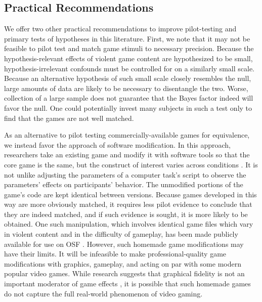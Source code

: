 \documentclass[man]{apa6}
\begin{document}
\subsection{Practical Recommendations}
We offer two other practical recommendations to improve pilot-testing and primary tests of hypotheses in this literature. First, we note that it may not be feasible to pilot test and match game stimuli to necessary precision. Because the hypothesis-relevant effects of violent game content are hypothesized to be small, hypothesis-irrelevant confounds must be controlled for on a similarly small scale. Because an alternative hypothesis of such small scale closely resembles the null, large amounts of data are likely to be necessary to disentangle the two. Worse, collection of a large sample does not guarantee that the Bayes factor indeed will favor the null. One could potentially invest many subjects in such a test only to find that the games are not well matched. 

As an alternative to pilot testing commercially-available games for equivalence, we instead favor the approach of software modification. In this approach, researchers take an existing game and modify it with software tools so that the core game is the same, but the construct of interest varies across conditions \citep[see][]{Elson:Quandt:2014}. It is not unlike adjusting the parameters of a computer task's script to observe the parameters' effects on participants' behavior. The unmodified portions of the game's code are kept identical between versions. Because games developed in this way are more obviously matched, it requires less pilot evidence to conclude that they are indeed matched, and if such evidence is sought, it is more likely to be obtained. One such manipulation, which involves identical game files which vary in violent content and in the difficulty of gameplay, has been made publicly available for use on OSF \citep{Hilgard:2014}. However, such homemade game modifications may have their limits. It will be infeasible to make professional-quality game modifications with graphics, gameplay, and acting on par with some modern popular video games. While research suggests that graphical fidelity is not an important moderator of game effects \citep{Barlett:etal:2008,Ivory:Kalyanaraman:2007}, it is possible that such homemade games do not capture the full real-world phenomenon of video gaming.
\end{document}
